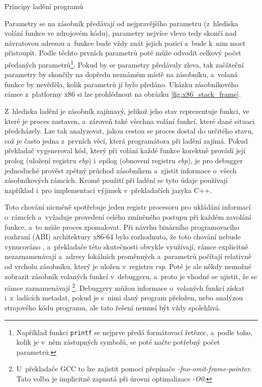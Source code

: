 \documentclass[czech,bachelor,male,python,dept460,hidelinks]{diploma}						%
\newcommand{\parspace}[1][]{
	\ifthenelse{\isempty{#1}}{\vspace{0mm}}{\vspace{#1}}
	\par
}
\begin{document}
\begin{section}{Principy ladění programů}
		\parspace Parametry se na zásobník předávají od nejpravějšího parametru (z~hlediska volání funkce ve zdrojovém kódu), parametry nejvíce vlevo tedy skončí nad
		návratovou adresou a~funkce bude vždy znát jejich pozici a~bude k~nim moct přistoupit. Podle těchto prvních parametrů poté může odvodit celkový
		počet předaných parametrů\footnote{Například funkci \texttt{printf} se nejprve předá formátovací řetězec, a~podle toho, kolik je v~něm
		zástupných symbolů, se poté načte potřebný počet parametrů.}. Pokud by se parametry předávaly zleva, tak začáteční parametry by skončily na dopředu neznámém
		místě na zásobníku, a~volaná funkce by nevěděla, kolik parametrů jí bylo předáno. Ukázku zásobníkového rámce z~platformy x86 si lze
		prohlédnout na obrázku \ref{fig:x86_stack_frame}.
		
		
		
		\parspace Z~hlediska ladění je zásobník zajímavý, jelikož jeho stav reprezentuje funkci, ve které je proces zastaven, a~zároveň také všechna volání
		funkcí, které dané situaci předcházely. Lze tak analyzovat, jakou cestou se proces dostal do určitého stavu, což je často jedna z~prvních věcí, která
		programátora při ladění zajímá. Pokud překladač vygeneroval kód, který při volání každé funkce korektně provádí její prolog (uložení registru \textit{ebp})
		i~epilog (obnovení registru \textit{ebp}), je pro debugger jednoduché provést zpětný průchod zásobníkem a~zjistit informace o~všech zásobníkových rámcích.
		Kromě použití při ladění se tyto údaje používají například i~pro implementaci výjimek v~překladačích jazyka C++.
		
		\parspace Toto chování nicméně spotřebuje jeden registr procesoru pro ukládání informací o~rámcích a~vyžaduje provedení celého zmíněného postupu při každém
		zavolání funkce, a~to může proces zpomalovat. Při návrhu binárního programovacího rozhraní (ABI) architektury x86-64 bylo rozhodnuto, že toto chování nebude
		vynucováno \cite[16]{x64abi}, a~překladače této skutečnosti obvykle využívají, rámce explicitně nezaznamenávají a~adresy
		lokálních proměnných a~parametrů počítají relativně od vrcholu zásobníku, který je uložen v~registru \textit{rsp}.
		Poté je ale někdy nemožné zobrazit zásobník volaných funkcí v~debuggeru, a~proto je vhodné se ujistit,
		že se rámce zaznamenávají \footnote{U~překladače GCC to lze zajistit pomocí přepínače \textit{-fno-omit-frame-pointer}.
		Tato volba je implicitně zapnutá při úrovni optimalizace -\textit{O0}. }.
		Debuggery můžou informace o~volaných funkcí získat i~z~ladících metadat, pokud je s~nimi daný program přeložen,
		nebo analýzou strojového kódu programu, ale tato řešení nemusí být vždy spolehlivá.
\end{section}
\end{document}
